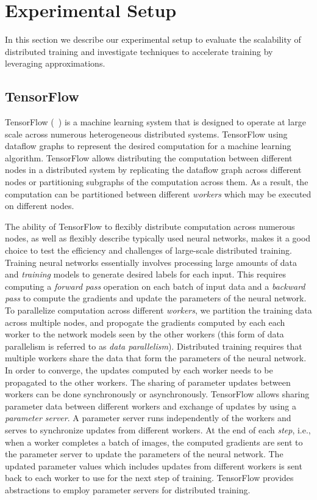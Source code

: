 \section{Experimental Setup}
In this section we describe our experimental setup to evaluate the scalability of distributed training and investigate techniques to accelerate training by leveraging approximations. 
\subsection{TensorFlow}
TensorFlow (~\cite{tensorflow}) is a machine learning system that is designed to operate at large scale across numerous heterogeneous distributed systems. TensorFlow using dataflow graphs to represent the desired computation for a machine learning algorithm. TensorFlow allows distributing the computation between different nodes in a distributed system by replicating the dataflow graph across different nodes or partitioning subgraphs of the computation across them. As a result, the computation can be partitioned between different \emph{workers} which may be executed on different nodes. 

The ability of TensorFlow to flexibly distribute computation across numerous nodes, as well as flexibly describe typically used neural networks, makes it a good choice to test the efficiency and challenges of large-scale distributed training. Training neural networks essentially involves processing large amounts of data and \emph{training} models to generate desired labels for each input. This requires computing a \emph{forward pass} operation on each batch of input data and a \emph{backward pass} to compute the gradients and update the parameters of the neural network. To parallelize computation across different \emph{workers}, we partition the training data across multiple nodes, and propogate the gradients computed by each each worker to the network models seen by the other workers (this form of data parallelism is referred to as \emph{data parallelism}). Distributed training requires that multiple workers share the data that form the parameters of the neural network. In order to converge, the updates computed by each worker needs to be propagated to the other workers. The sharing of parameter updates between workers can be done synchronously or asynchronously. TensorFlow allows sharing parameter data between different workers and exchange of updates by using a \emph{parameter server}\cite{parameter_server}. A parameter server runs independently of the workers and serves to synchronize updates from different workers. At the end of each \emph{step}, i.e., when a worker completes a batch of images, the computed gradients are sent to the parameter server to update the parameters of the neural network. The 
updated parameter values which includes updates from different workers is sent back to each worker to use for the next step of training.
TensorFlow provides abstractions to employ parameter servers for distributed training. 

